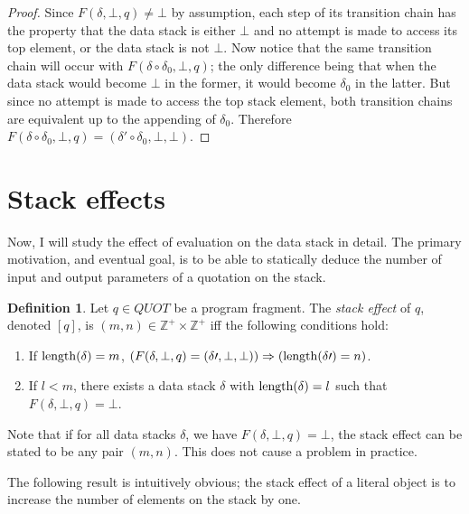 \documentclass{amsart}
\theoremstyle{plain}
\theoremstyle{definition}
\newtheorem{definition}[theorem]{Definition}
\def\leng{\mathop{\rm length}}
\begin{document}
\begin{proof}
Since $F(\delta,\bot,q)\ne\bot$ by assumption, each step of its transition chain has the
property that the data stack is either $\bot$ and no attempt is made to access its top
element, or the data stack is not $\bot$. Now notice that the same transition chain will
occur with $F(\delta\circ \delta_0,\bot,q)$; the only difference being that when the data stack would become $\bot$ in the former, it would become $\delta_0$ in the latter. But since no attempt is made to access the top stack element, both transition chains are equivalent up to the appending of $\delta_0$. Therefore  $F(\delta\circ \delta_0,\bot,q)=(\delta\prime\circ \delta_0,\bot,\bot)$.

\end{proof}

\section{Stack effects}

Now, I will study the effect of evaluation on the data stack in detail. The primary motivation, and
eventual goal, is to be able to statically deduce the number of input and output parameters
of a quotation on the stack.

\begin{definition} Let $q \in QUOT$ be a program fragment. The \emph{stack effect} of $q$, denoted $[q]$, is $(m,n)\in \mathbb{Z}^+\times\mathbb{Z}^+$ iff the following conditions hold:

\begin{enumerate}

\item If $\leng(\delta)=m$, $(F(\delta,\bot,q)=(\delta\prime,\bot,\bot)) \Rightarrow (\leng(\delta\prime)=n)$.

\item If $l<m$, there exists a data stack $\delta$ with $\leng(\delta)=l$ such that $F(\delta,\bot,q)=\bot$.

\end{enumerate}

Note that if for all data stacks $\delta$, we have $F(\delta,\bot,q)=\bot$, the stack effect can be stated to be any pair $(m,n)$. This does not cause a problem in practice.

\end{definition}

The following result is intuitively obvious; the stack effect of a literal object is to increase the number of elements on the stack by one.
\end{document}
